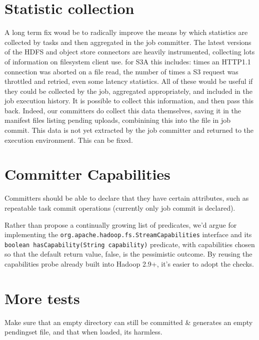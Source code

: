 \documentclass{article}
\begin{document}
\section{Statistic collection}

A long term fix woud be to radically improve the means by which statistics are
collected by tasks and then aggregated in the job committer.
The latest versions of the HDFS and object store connectors are heavily instrumented,
collecting lots of information on filesystem client use.
for S3A this includes: times an HTTP1.1 connection was aborted on a file read,
the number of times a S3 request was throttled and retried,
even some latency statistics.
All of these would be useful if they could be collected by the job, aggregated
appropriately, and included in the job execution history.
It is possible to collect this information, and then pass this back.
Indeed, our committers do collect this data themselves, saving it in the
manifest files listing pending uploads, combinining this into the \SUCCESS file
in job commit.
This data is not yet extracted by the job committer and returned to the execution
environment.
This can be fixed.

\section{Committer Capabilities}

Committers should be able to declare that they have certain attributes, such
as repeatable task commit operations (currently only job commit is declared).

Rather than propose a continually growing list of predicates, we'd argue for
implementing the \texttt{org.apache.hadoop.fs.StreamCapabilities} interface
and its \texttt{boolean hasCapability(String capability)} predicate, with capabilities
chosen so that the default return value, false, is the pessimistic outcome.
By reusing the capabilities probe already built into Hadoop 2.9+, it's  easier
to adopt the checks.



\section{More tests}


Make sure that an empty directory can still be committed & generates
an empty pendingset  file, and that when loaded, its harmless.
\end{document}
